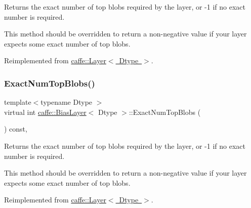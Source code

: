 Returns the exact number of top blobs required by the layer, or -\/1 if no exact number is required. 

This method should be overridden to return a non-\/negative value if your layer expects some exact number of top blobs. 

Reimplemented from \mbox{\hyperlink{classcaffe_1_1_layer_a64e2ca72c719e4b2f1f9216ccfb0d37f}{caffe\+::\+Layer$<$ Dtype $>$}}.

\mbox{\label{classcaffe_1_1_bias_layer_a9552dc137a5bcbdd17bdb3321d678595}} 
\subsubsection{\texorpdfstring{Exact\+Num\+Top\+Blobs()}{ExactNumTopBlobs()}\hspace{0.1cm}{\footnotesize\ttfamily [2/2]}}
{\footnotesize\ttfamily template$<$typename Dtype $>$ \\
virtual int \mbox{\hyperlink{classcaffe_1_1_bias_layer}{caffe\+::\+Bias\+Layer}}$<$ Dtype $>$\+::Exact\+Num\+Top\+Blobs (\begin{DoxyParamCaption}{ }\end{DoxyParamCaption}) const\hspace{0.3cm}{\ttfamily [inline]}, {\ttfamily [virtual]}}



Returns the exact number of top blobs required by the layer, or -\/1 if no exact number is required. 

This method should be overridden to return a non-\/negative value if your layer expects some exact number of top blobs. 

Reimplemented from \mbox{\hyperlink{classcaffe_1_1_layer_a64e2ca72c719e4b2f1f9216ccfb0d37f}{caffe\+::\+Layer$<$ Dtype $>$}}.

\mbox{\label{classcaffe_1_1_bias_layer_a2c9d072e5e641b247988f22be20520ea}} 
